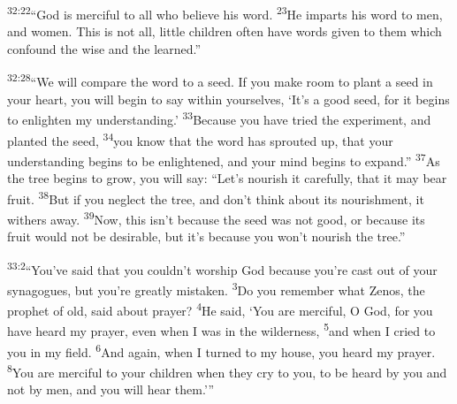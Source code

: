 \documentclass[openany,12pt,english]{book}
\newenvironment{para}{\par\pretolerance=100\tolerance=200\setlength{\emergencystretch}{0.6em}\relax}{\par}
\begin{document}
\begin{para}
    \textsuperscript{32:22}\thinspace{}“God is mer\-ci\-ful to all who be\-lieve his word.
    \textsuperscript{23}\thinspace{}He imparts his word to men, and wom\-en. This is not all, lit\-tle chil\-dren of\-ten have words giv\-en to them which con\-found the wise and the learn\-ed.”
\end{para}

\begin{para}
    \textsuperscript{32:28}\thinspace{}“We will com\-pare the word to a seed. If you make room to plant a seed in your heart, you will be\-gin to say with\-in your\-selves, ‘It's a good seed, for it begins to en\-light\-en my un\-der\-stand\-ing.’
    \textsuperscript{33}\thinspace{}Be\-cause you have tried the ex\-per\-i\-ment, and planted the seed,
    \textsuperscript{34}\thinspace{}you know that the word has sprouted up, that your un\-der\-stand\-ing begins to be enlightened, and your mind begins to ex\-pand.”
    \textsuperscript{37}\thinspace{}As the tree begins to grow, you will say: “Let's nour\-ish it care\-ful\-ly, that it may bear fruit.
    \textsuperscript{38}\thinspace{}But if you ne\-glect the tree, and don't think a\-bout its nour\-ish\-ment, it with\-ers a\-way.
    \textsuperscript{39}\thinspace{}Now, this is\-n't be\-cause the seed was not good, or be\-cause its fruit would not be de\-sir\-a\-ble, but it's be\-cause you won't nour\-ish the tree.”
\end{para}

\begin{para}
    \textsuperscript{33:2}\thinspace{}“You've said that you could\-n't wor\-ship God be\-cause you're cast out of your synagogues, but you're great\-ly mis\-tak\-en.
    \textsuperscript{3}\thinspace{}Do you re\-mem\-ber what Zenos, the proph\-et of old, said a\-bout pray\-er?
    \textsuperscript{4}\thinspace{}He said, ‘You are mer\-ci\-ful, O God, for you have heard my pray\-er, e\-ven when I was in the wil\-der\-ness,
    \textsuperscript{5}\thinspace{}and when I cried to you in my field.
    \textsuperscript{6}\thinspace{}And a\-gain, when I turned to my house, you heard my pray\-er.
    \textsuperscript{8}\thinspace{}You are mer\-ci\-ful to your chil\-dren when they cry to you, to be heard by you and not by men, and you will hear them.’”
\end{para}
\end{document}
